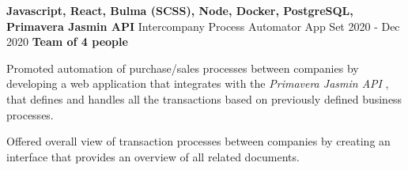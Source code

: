 \cventry
  {\textbf{Javascript, React, Bulma (SCSS), Node, Docker, PostgreSQL, Primavera Jasmin API}}
  {Intercompany Process Automator App \href{https://github.com/EduRibeiro00/CimbaIntercompany-feup-sinf}{\faExternalLink}} %
  {Set 2020 - Dec 2020}
  {\textbf{Team of 4 people}}
  {
    \begin{cvitems} %
      \item {Promoted automation of purchase/sales processes between companies by developing a web application that integrates with the \textit{Primavera Jasmin API}  \href{https://www.jasminsoftware.pt/}{\faExternalLink}, that defines and handles all the transactions based on previously defined business processes.}
      \item {Offered overall view of transaction processes between companies by creating an interface that provides an overview of all related documents.}
    \end{cvitems}
  }